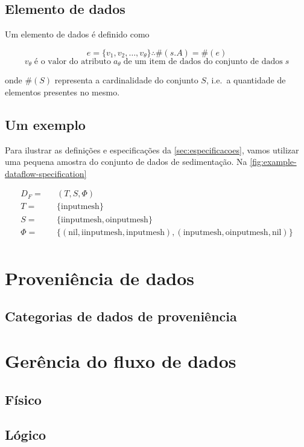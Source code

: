\subsection{Elemento de dados}

Um elemento de dados é definido como

\[ e = \{ v_1, v_2, \ldots, v_{\theta} \} \therefore \#(s.A) = \#(e) \]
\[ v_{\theta} \; \textrm{é o valor do atributo} \; a_{\theta} \; \textrm{de um item de dados do conjunto de dados} \; s \]

onde \( \#(S) \) representa a cardinalidade do conjunto \( S \), i.e.\ a quantidade de elementos presentes no mesmo.

\subsection{Um exemplo}

Para ilustrar as definições e especificações da \autoref{sec:especificacoes}, vamos utilizar uma pequena amostra do conjunto de dados de sedimentação. Na \autoref{fig:example-dataflow-specification} 



\[
\begin{aligned}
D_F = && (T, S, \Phi) \\
T = && \{ \textrm{inputmesh} \} \\
S = && \{ \textrm{iinputmesh}, \textrm{oinputmesh} \} \\
\Phi = && \{ (\textrm{nil}, \textrm{iinputmesh}, \textrm{inputmesh}),
(\textrm{inputmesh}, \textrm{oinputmesh}, \textrm{nil})
\} \\
\end{aligned}
\]


\section{Proveniência de dados}
\subsection{Categorias de dados de proveniência}

\section{Gerência do fluxo de dados}
\subsection{Físico}
\subsection{Lógico}
